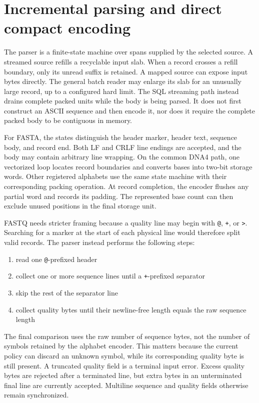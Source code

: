 \section{Incremental parsing and direct compact encoding}
\label{sec:io-parsing}

The parser is a finite-state machine over spans supplied by the selected
source. A streamed source refills a recyclable input slab. When a record
crosses a refill boundary, only its unread suffix is retained. A mapped source
can expose input bytes directly. The general batch reader may enlarge its slab
for an unusually large record, up to a configured hard limit. The SQL
streaming path instead drains complete packed units while the body is being
parsed. It does not first construct an ASCII sequence and then encode it, nor
does it require the complete packed body to be contiguous in memory.

For FASTA, the states distinguish the header marker, header text, sequence
body, and record end. Both LF and CRLF line endings are accepted, and the body
may contain arbitrary line wrapping. On the common DNA4 path, one vectorized
loop locates record boundaries and converts bases into two-bit storage words.
Other registered alphabets use the same state machine with their corresponding
packing operation. At record completion, the encoder flushes any partial word
and records its padding. The represented base count can then exclude unused
positions in the final storage unit.

FASTQ needs stricter framing because a quality line may begin with
\texttt{@}, \texttt{+}, or \texttt{>}. Searching for a marker at the start of
each physical line would therefore split valid records. The parser instead
performs the following steps:

\begin{enumerate}
    \item read one \texttt{@}-prefixed header
    \item collect one or more sequence lines until a \texttt{+}-prefixed
    separator
    \item skip the rest of the separator line
    \item collect quality bytes until their newline-free length equals the raw
    sequence length
\end{enumerate}

The final comparison uses the raw number of sequence bytes, not the number of
symbols retained by the alphabet encoder. This matters because the current
policy can discard an unknown symbol, while its corresponding quality byte is
still present. A truncated quality field is a terminal input error. Excess
quality bytes are rejected after a terminated line, but extra bytes in an
unterminated final line are currently accepted. Multiline sequence and quality
fields otherwise remain synchronized.

